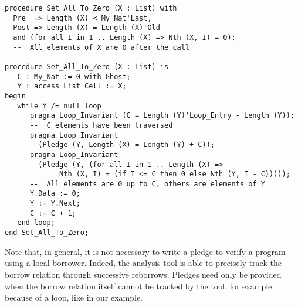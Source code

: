 \documentclass[runningheads]{llncs}
\begin{document}
\begin{lstlisting}
procedure Set_All_To_Zero (X : List) with
  Pre  => Length (X) < My_Nat'Last,
  Post => Length (X) = Length (X)'Old
  and (for all I in 1 .. Length (X) => Nth (X, I) = 0);
  --  All elements of X are 0 after the call

procedure Set_All_To_Zero (X : List) is
   C : My_Nat := 0 with Ghost;
   Y : access List_Cell := X;
begin
   while Y /= null loop
      pragma Loop_Invariant (C = Length (Y)'Loop_Entry - Length (Y));
      --  C elements have been traversed
      pragma Loop_Invariant
        (Pledge (Y, Length (X) = Length (Y) + C));
      pragma Loop_Invariant
        (Pledge (Y, (for all I in 1 .. Length (X) =>
             Nth (X, I) = (if I <= C then 0 else Nth (Y, I - C)))));
      --  All elements are 0 up to C, others are elements of Y
      Y.Data := 0;
      Y := Y.Next;
      C := C + 1;
   end loop;
end Set_All_To_Zero;
\end{lstlisting}
Note that, in general, it is not necessary to write a pledge to verify a program using a local borrower. Indeed, the analysis tool is able to precisely track the borrow relation through successive reborrows. Pledges need only be provided when the borrow relation itself cannot be tracked by the tool, for example because of a loop, like in our example.

\end{document}
